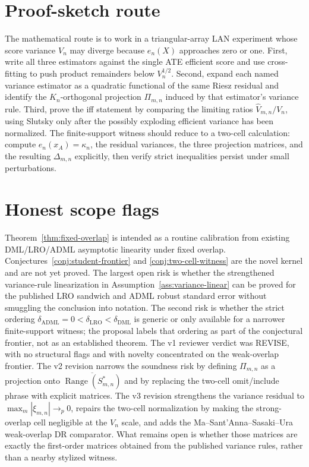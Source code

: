 \documentclass[11pt]{article}
\theoremstyle{definition}
\theoremstyle{plain}
\theoremstyle{remark}
\begin{document}
\section{Proof-sketch route}
The mathematical route is to work in a triangular-array LAN experiment whose score variance \(V_n\) may diverge because \(e_n(X)\) approaches zero or one.  First, write all three estimators against the single ATE efficient score and use cross-fitting to push product remainders below \(V_n^{1/2}\).  Second, expand each named variance estimator as a quadratic functional of the same Riesz residual and identify the \(K_n\)-orthogonal projection \(\Pi_{m,n}\) induced by that estimator's variance rule.  Third, prove the iff statement by comparing the limiting ratios \(\hat V_{m,n}/V_n\), using Slutsky only after the possibly exploding efficient variance has been normalized.  The finite-support witness should reduce to a two-cell calculation: compute \(e_n(x_A)=\kappa_n\), the residual variances, the three projection matrices, and the resulting \(\Delta_{m,n}\) explicitly, then verify strict inequalities persist under small perturbations.

\section{Honest scope flags}
Theorem~\ref{thm:fixed-overlap} is intended as a routine calibration from existing DML/LRO/ADML asymptotic linearity under fixed overlap.  Conjectures~\ref{conj:student-frontier} and \ref{conj:two-cell-witness} are the novel kernel and are not yet proved.  The largest open risk is whether the strengthened variance-rule linearization in Assumption~\ref{ass:variance-linear} can be proved for the published LRO sandwich and ADML robust standard error without smuggling the conclusion into notation.  The second risk is whether the strict ordering \(\delta_{\mathrm{ADML}}=0<\delta_{\mathrm{LRO}}<\delta_{\mathrm{DML}}\) is generic or only available for a narrower finite-support witness; the proposal labels that ordering as part of the conjectural frontier, not as an established theorem.  The v1 reviewer verdict was REVISE, with no structural flags and with novelty concentrated on the weak-overlap frontier.  The v2 revision narrows the soundness risk by defining \(\Pi_{m,n}\) as a projection onto \(\overline{\operatorname{Range}(S_{m,n}^*)}\) and by replacing the two-cell omit/include phrase with explicit matrices.  The v3 revision strengthens the variance residual to \(\max_m|\xi_{m,n}|\to_p0\), repairs the two-cell normalization by making the strong-overlap cell negligible at the \(V_n\) scale, and adds the Ma--Sant'Anna--Sasaki--Ura weak-overlap DR comparator.  What remains open is whether those matrices are exactly the first-order matrices obtained from the published variance rules, rather than a nearby stylized witness.
\end{document}
